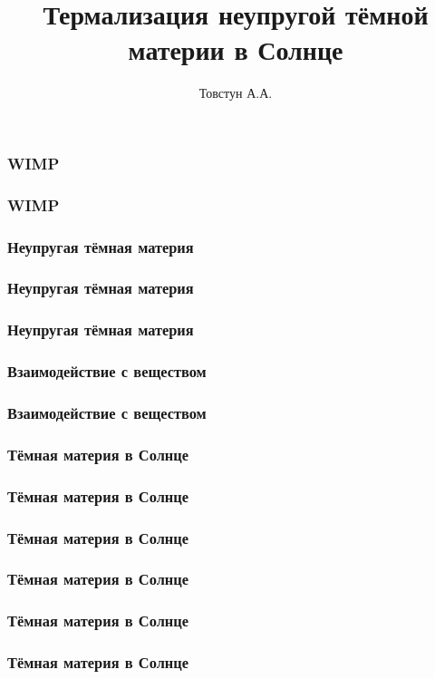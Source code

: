 


\title{Термализация неупругой тёмной материи в Солнце} 
\author[]{Товстун А.А.}
	
	\begin{frame}
		\titlepage %
	\end{frame}
	
	\begin{frame}
		\frametitle{WIMP}
		
	\end{frame}
	
	\begin{frame}
		\frametitle{WIMP}
		
	\end{frame}
	
	\begin{frame}
		\frametitle{Неупругая тёмная материя}
		
	\end{frame}
	
	\begin{frame}
		\frametitle{Неупругая тёмная материя}
		
	\end{frame}
	
	\begin{frame}
		\frametitle{Неупругая тёмная материя}
		
	\end{frame}
	
	\begin{frame}
		\frametitle{Взаимодействие с веществом}
		
	\end{frame}
	
	\begin{frame}
		\frametitle{Взаимодействие с веществом}
		
	\end{frame}
	
	\begin{frame}
		\frametitle{Тёмная материя в Солнце}
		
	\end{frame}
	
	\begin{frame}
		\frametitle{Тёмная материя в Солнце}
		
	\end{frame}

	\begin{frame}
	\frametitle{Тёмная материя в Солнце}
	
	\end{frame}
	
	\begin{frame}
		\frametitle{Тёмная материя в Солнце}
		
	\end{frame}
	\begin{frame}
		\frametitle{Тёмная материя в Солнце}
		
	\end{frame}
	\begin{frame}
		\frametitle{Тёмная материя в Солнце}
		
	\end{frame}
	
